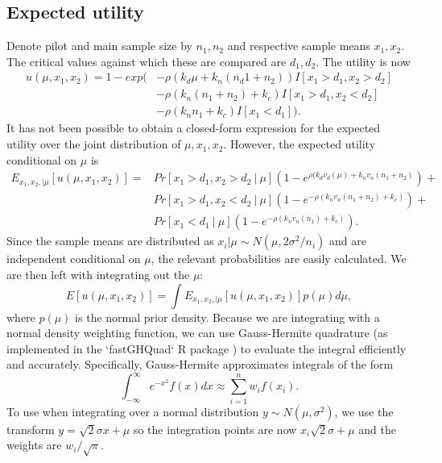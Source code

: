 \documentclass[sagev]{sagej}
\begin{document}
\subsection{Expected utility}

Denote pilot and main sample size by $n_1, n_2$ and respective sample means $x_1, x_2$. The critical values against which these are compared are $d_1, d_2$. The utility is now
\begin{equation}
\begin{split}
u(\mu, x_1, x_2) = 1 - exp(&-\rho(k_d\mu + k_n (n_d1+n_2))I[x_1>d_1, x_2>d_2] \\ 
  &- \rho(k_n (n_1+n_2) + k_c)I[x_1 > d_1, x_2 < d_2] \\
  &- \rho(k_n n_1 + k_c)I[x_1 < d_1] ).
\end{split}
\end{equation}
It has not been possible to obtain a closed-form expression for the expected utility over the joint distribution of $\mu, x_1, x_2$. However, the expected utility conditional on $\mu$ is
\begin{equation}\label{eqn:joint_cond_util}
\begin{split}
E_{x_1, x_2, | \mu}[u(\mu, x_1, x_2)] =& Pr[x_1>d_1, x_2>d_2  ~|~ \mu]\left(1-e^{\rho(k_dv_d(\mu) + k_n v_n(n_1+n_2)}\right) + \\
& Pr[x_1 > d_1, x_2 < d_2  ~|~ \mu] \left(1- e^{-\rho(k_n v_n(n_1+n_2) + k_c)} \right) + \\
& Pr[x_1 < d_1  ~|~ \mu] \left( 1-e^{-\rho(k_n v_n(n_1) + k_c)} \right).
\end{split}
\end{equation}
Since the sample means are distributed as $x_i | \mu \sim N(\mu, 2\sigma^2/n_i)$ and are independent conditional on $\mu$, the relevant probabilities are easily calculated. We are then left with integrating out the $\mu$:
$$
E[u(\mu, x_1, x_2)] = \int E_{x_1, x_2, | \mu} [ u(\mu, x_1, x_2)] p(\mu) d\mu, 
$$
where $p(\mu)$ is the normal prior density. Because we are integrating with a normal density weighting function, we can use Gauss-Hermite quadrature (as implemented in the `fastGHQuad` R package \cite{Blocker2018}) to evaluate the integral efficiently and accurately. Specifically, Gauss-Hermite approximates integrals of the form
$$
\int_{-\infty}^{\infty} e^{-x^2}f(x) dx \approx \sum_{i=1}^{n} w_i f(x_i).
$$
To use when integrating over a normal distribution $y \sim N(\mu, \sigma^2)$, we use the transform $y = \sqrt{2}\sigma x + \mu$ so the integration points are now $x_i\sqrt{2}\sigma + \mu$ and the weights are $w_i / \sqrt{\pi}$.
\end{document}
